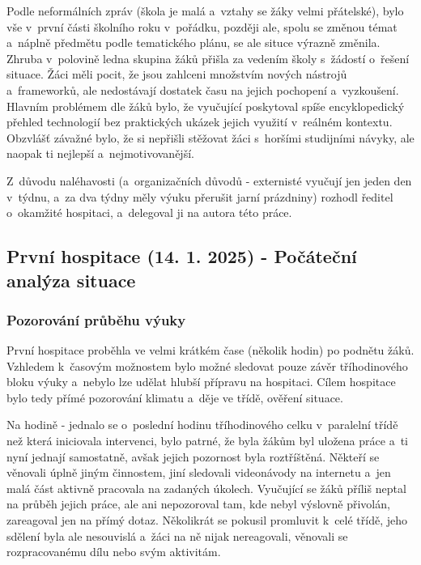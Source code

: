 Podle neformálních zpráv (škola je malá a~vztahy se žáky velmi přátelské), bylo vše v~první části školního roku v~pořádku, později ale, spolu se změnou témat a~náplně předmětu podle tematického plánu, se ale situce výrazně změnila. Zhruba v~polovině ledna skupina žáků přišla za vedením školy s~žádostí o~řešení situace. Žáci měli pocit, že jsou zahlceni množstvím nových nástrojů a~frameworků, ale nedostávají dostatek času na jejich pochopení a~vyzkoušení. Hlavním problémem dle žáků bylo, že vyučující poskytoval spíše encyklopedický přehled technologií bez praktických ukázek jejich využití v~reálném kontextu. Obzvlášť závažné bylo, že si nepřišli stěžovat žáci s~horšími studijními návyky, ale naopak ti nejlepší a~nejmotivovanější.

Z~důvodu naléhavosti (a~organizačních důvodů - externisté vyučují jen jeden den v~týdnu, a~za dva týdny měly výuku přerušit jarní prázdniny) rozhodl ředitel o~okamžité hospitaci, a~delegoval ji na autora této práce.


\subsection{První hospitace (14. 1. 2025) - Počáteční analýza situace}

\subsubsection*{Pozorování průběhu výuky}

První hospitace proběhla ve velmi krátkém čase (několik hodin) po podnětu žáků. Vzhledem k~časovým možnostem bylo možné sledovat pouze závěr tříhodinového bloku výuky a~nebylo lze udělat hlubší přípravu na hospitaci. Cílem hospitace bylo tedy přímé pozorování klimatu a~děje ve třídě, ověření situace.

Na hodině - jednalo se o~poslední hodinu tříhodinového celku v~paralelní třídě než která iniciovala intervenci, bylo patrné, že byla žákům byl uložena práce a~ti nyní jednají samostatně, avšak jejich pozornost byla roztříštěná. Někteří se věnovali úplně jiným činnostem, jiní sledovali videonávody na internetu a~jen malá část aktivně pracovala na zadaných úkolech. Vyučující se žáků příliš neptal na průběh jejich práce, ale ani nepozoroval tam, kde nebyl výslovně přivolán, zareagoval jen na přímý dotaz. Několikrát se pokusil promluvit k~celé třídě, jeho sdělení byla ale nesouvislá a~žáci na ně nijak nereagovali, věnovali se rozpracovanému dílu nebo svým aktivitám. 

